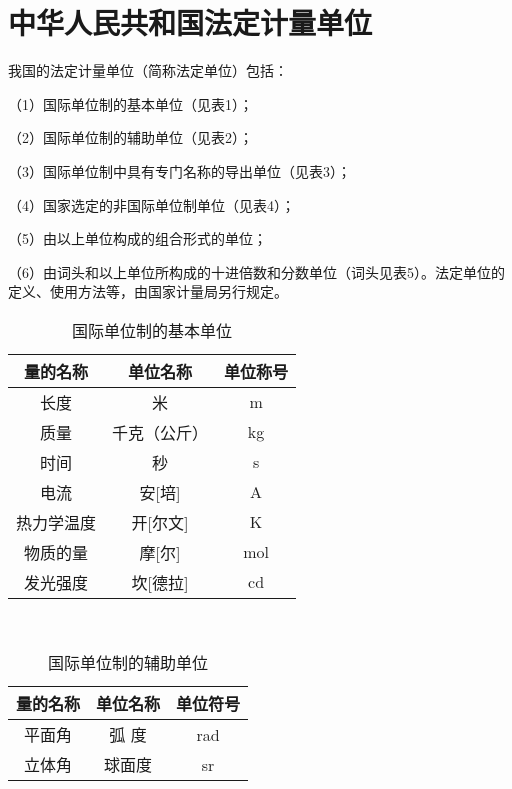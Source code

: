 \chapter{中华人民共和国法定计量单位}

我国的法定计量单位（简称法定单位）包括：

（1）国际单位制的基本单位（见表1）；

（2）国际单位制的辅助单位（见表2）；

（3）国际单位制中具有专门名称的导出单位（见表3）；

（4）国家选定的非国际单位制单位（见表4）；

（5）由以上单位构成的组合形式的单位；

（6）由词头和以上单位所构成的十进倍数和分数单位（词头见表5）。法定单位的定义、使用方法等，由国家计量局另行规定。 \hspace*{\fill} \\


\begin{table}[htbp]
  \centering
  \caption{国际单位制的基本单位}
  \begin{tabular}{ccc}
    \toprule
    量的名称   & 单位名称     & 单位称号 \\
    \midrule
    长度       & 米           & m        \\
    质量       & 千克（公斤） & kg       \\
    时间       & 秒           & s        \\
    电流       & 安[培]       & A        \\
    热力学温度 & 开[尔文]     & K        \\
    物质的量   & 摩[尔]       & mol      \\
    发光强度   & 坎[德拉]     & cd       \\
    \bottomrule
  \end{tabular}%
  \label{tab:tbl-b1}%
\end{table}%

\hspace*{\fill} \\


\begin{table}[htbp]
  \centering
  \caption{国际单位制的辅助单位}
  \begin{tabular}{ccc}
    \toprule
    量的名称 & 单位名称 & 单位符号 \\
    \midrule
    平面角   & 弧 度    & rad      \\
    立体角   & 球面度   & sr       \\
    \bottomrule
  \end{tabular}%
  \label{tab:tbl-b2}%
\end{table}%

